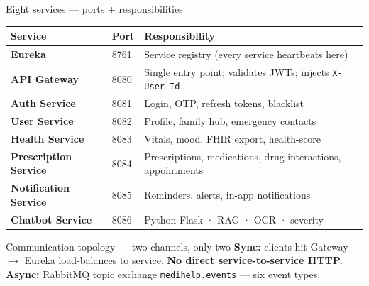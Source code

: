 \documentclass[aspectratio=169,11pt]{beamer}
\begin{document}
\begin{frame}{Eight services --- ports + responsibilities}
  \footnotesize
  \begin{center}
  \begin{tabular}{>{\bfseries}l l l}
    \toprule
    Service & Port & Responsibility \\
    \midrule
    Eureka & 8761 & Service registry (every service heartbeats here) \\
    API Gateway & 8080 & Single entry point; validates JWTs; injects \texttt{X-User-Id} \\
    Auth Service & 8081 & Login, OTP, refresh tokens, blacklist \\
    User Service & 8082 & Profile, family hub, emergency contacts \\
    Health Service & 8083 & Vitals, mood, FHIR export, health-score \\
    Prescription Service & 8084 & Prescriptions, medications, drug interactions, appointments \\
    Notification Service & 8085 & Reminders, alerts, in-app notifications \\
    Chatbot Service & 8086 & Python Flask · RAG · OCR · severity \\
    \bottomrule
  \end{tabular}
  \end{center}
  \vspace{4pt}
  \begin{block}{Communication topology --- two channels, only two}
    \small \textbf{Sync:} clients hit Gateway $\rightarrow$ Eureka load-balances to service. \quad \textbf{No direct service-to-service HTTP.}\\
    \textbf{Async:} RabbitMQ topic exchange \texttt{medihelp.events} --- six event types.
  \end{block}
\end{frame}
\end{document}
